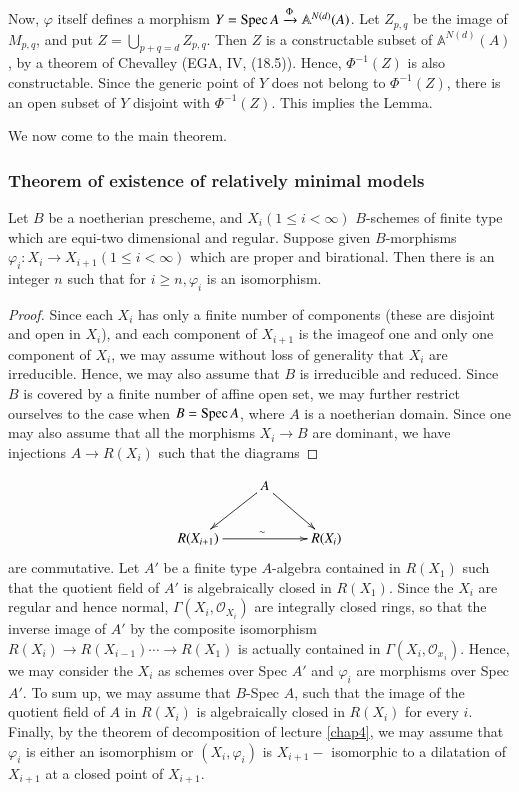 Now, $\varphi$ itself defines a morphism $Y=\operatorname{Spec} A
\xrightarrow{\Phi}\mathbb{A}^{N(d)}(A)$. Let $Z_{p,q}$ be the
image of $M_{p,q}$, and put $Z=\bigcup\limits_{p+q=d}Z_{p,q}$. Then
$Z$ is a constructable subset of $\mathbb{A}^{N(d)} (A)$, by a theorem
of Chevalley (EGA, IV, (18.5)). Hence, $\Phi^{-1}(Z)$ is also
constructable. Since the generic point of $Y$ does not belong to
$\Phi^{-1}(Z)$, there is an open subset of $Y$ disjoint with
$\Phi^{-1}(Z)$. This implies the Lemma.

We now come to the main theorem.

\subsubsection*{Theorem of existence of relatively minimal models}

Let $B$  be a noetherian prescheme, and $X_i (1 \le i < \infty)$
$B$-schemes of finite type which are equi-two dimensional and
regular. Suppose given $B$-morphisms $\varphi_i : X_i \rightarrow
X_{i+1} (1 \le i < \infty)$ which are proper and birational. Then
there is an integer $n$ such that for $i \ge n, \varphi_i$  is an
isomorphism. 

\begin{proof}
  Since each $X_i$ has only a finite number of components (these are
  disjoint and open in $X_i$), and each component of $X_{i+1}$ is the
  image\pageoriginale of one and only one component of $X_i$, we may
  assume without 
  loss of generality that $X_i$ are irreducible. Hence, we may also
  assume that $B$ is irreducible and reduced. Since $B$ is covered by
  a finite number of affine open set, we 
  may further restrict ourselves to the case when $B=\operatorname{Spec} A$, where
  $A$ is a noetherian domain. Since one may also assume that all the
  morphisms $X_i \rightarrow B$ are dominant, we have injections $A
  \rightarrow R (X_i)$ such that the diagrams  
\end{proof}

\[
\xymatrix{& A \ar[dl] \ar[dr] & \\
R(X_{i+1}) \ar[rr]^\sim &  & R(X_i)
}
\]
are commutative. Let $A'$ be a finite type $A$-algebra contained in
$R(X_1)$ such that the quotient field of $A'$ is algebraically closed
in $R(X_1)$. Since the $X_i$ are regular and hence normal, $\Gamma
(X_i, \mathscr{O}_{X_i})$ are integrally closed rings, so that  the
inverse image of $A'$ by the composite isomorphism $R(X_i) \rightarrow
R(X_{i-1}) \cdots \rightarrow R(X_1)$ is actually contained in $\Gamma
(X_i, \mathscr{O}_x{_{_i}})$. Hence, we may consider the $X_i$ as
schemes over Spec $A'$ and $\varphi_i$ are morphisms over Spec
$A'$. To sum up, we may assume that $B$-Spec $A$, such that the image
of the quotient field of $A$ in $R(X_i)$ is algebraically closed in
$R(X_i)$ for every $i$. Finally, by the theorem of decomposition of
lecture \ref{chap4}, we may assume that $\varphi_i$ is either an isomorphism
or $(X_i, \varphi_i)$ is $X_{i+1}-$ isomorphic to a dilatation of
$X_{i+1}$ at a closed point of $X_{i+1}$. 

